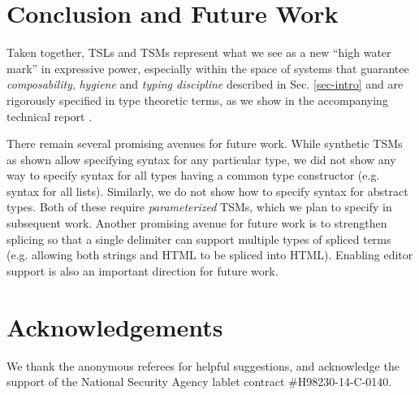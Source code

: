 \documentclass{sig-alternate}[10pt]
\begin{document}
\section{Conclusion and Future Work}\label{conclusion}
Taken together, TSLs and TSMs represent what we see as a new ``high water mark'' in expressive power, especially within the space of systems that guarantee \emph{composability}, \emph{hygiene} and \emph{typing discipline} described in Sec. \ref{sec-intro} and are rigorously specified in type theoretic terms, as we show in the accompanying technical report \cite{sac15tr}.

There remain several promising avenues for future work. While synthetic TSMs as shown allow specifying syntax for any particular type, we did not show any way to specify syntax for all types having a common type constructor (e.g. syntax for all lists). Similarly, we do not show how to specify syntax for abstract types. Both of these require \emph{parameterized} TSMs, which we plan to specify in subsequent work. Another promising avenue for future work is to strengthen splicing so that a single delimiter can support multiple types of spliced terms (e.g. allowing both strings and HTML to be spliced into HTML). Enabling editor support is also an important direction for future work.

\section*{Acknowledgements}
We thank the anonymous referees for helpful suggestions, and acknowledge the support of the National Security Agency lablet contract \#H98230-14-C-0140.



\end{document}
